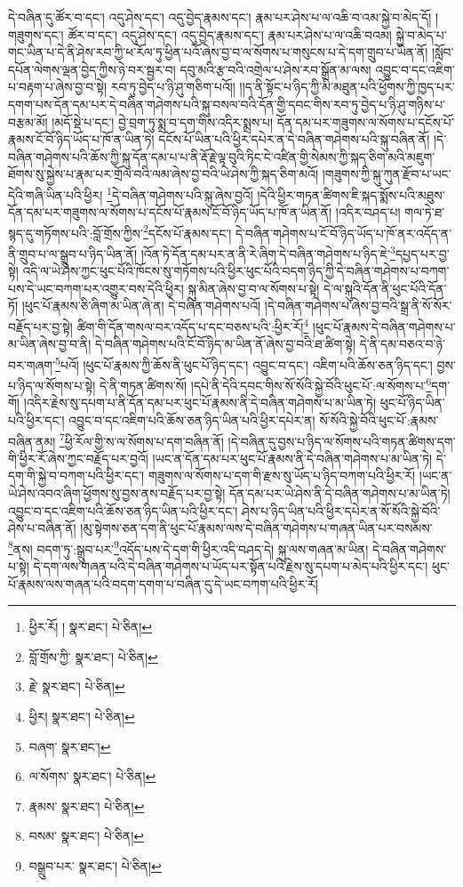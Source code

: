 དེ་བཞིན་དུ་ཚོར་བ་དང་། འདུ་ཤེས་དང་། འདུ་བྱེད་རྣམས་དང་། རྣམ་པར་ཤེས་པ་ལ་འཆི་བ་འམ་སྐྱེ་བ་མེད་དོ། །གཟུགས་དང་། ཚོར་བ་དང་། འདུ་ཤེས་དང་། འདུ་བྱེད་རྣམས་དང་། རྣམ་པར་ཤེས་པ་ལ་འཆི་བའམ། སྐྱེ་བ་མེད་པ་གང་ཡིན་པ་དེ་ནི་ཤེས་རབ་ཀྱི་ཕ་རོལ་ཏུ་ཕྱིན་པའོ་ཞེས་བྱ་བ་ལ་སོགས་པ་གསུངས་པ་དེ་དག་གྲུབ་པ་ཡིན་ནོ། །སློབ་དཔོན་ལེགས་ལྡན་བྱེད་ཀྱིས་ཉེ་བར་སྦྱར་བ། དབུ་མའི་རྩ་བའི་འགྲེལ་པ་ཤེས་རབ་སྒྲོན་མ་ལས། འབྱུང་བ་དང་འཇིག་པ་བརྟག་པ་ཞེས་བྱ་བ་སྟེ། རབ་ཏུ་བྱེད་པ་ཉི་ཤུ་གཅིག་པའོ།། །།ད་ནི་སྟོང་པ་ཉིད་ཀྱི་མི་མཐུན་པའི་ཕྱོགས་ཀྱི་ཁྱད་པར་དགག་པས་དོན་དམ་པར་དེ་བཞིན་གཤེགས་པའི་སྐུ་བསལ་བའི་དོན་གྱི་དབང་གིས་རབ་ཏུ་བྱེད་པ་ཉི་ཤུ་གཉིས་པ་བརྩམ་མོ། །མདོ་སྡེ་པ་དང་། བྱེ་བྲག་ཏུ་སྨྲ་བ་དག་གིས་འདིར་སྨྲས་པ། དོན་དམ་པར་གཟུགས་ལ་སོགས་པ་དངོས་པོ་རྣམས་ངོ་བོ་ཉིད་ཡོད་པ་ཁོ་ན་ཡིན་ཏེ། དངོས་པོ་ཡིན་པའི་ཕྱིར་དཔེར་ན་དེ་བཞིན་གཤེགས་པའི་སྐུ་བཞིན་ནོ། །དེ་བཞིན་གཤེགས་པའི་ཆོས་ཀྱི་སྐུ་དོན་དམ་པ་པ་ནི་རྡོ་རྗེ་ལྟ་བུའི་ཏིང་ངེ་འཛིན་གྱི་སེམས་ཀྱི་སྐད་ཅིག་མའི་མཇུག་ཐོགས་སུ་སྐྱེས་པ་རྣམ་པར་གྲོལ་བའི་ལམ་ཞེས་བྱ་བའི་ཡེ་ཤེས་ཀྱི་སྐད་ཅིག་མའོ། །གཟུགས་ཀྱི་སྐུ་ཀུན་རྫོབ་པ་ཡང་དེའི་གཞི་ཡིན་པའི་ཕྱིར། \footnote{ཕྱིར་རོ། །   སྣར་ཐང་།  པེ་ཅིན། }དེ་བཞིན་གཤེགས་པའི་སྐུ་ཞེས་བྱའོ། །དེའི་ཕྱིར་གཏན་ཚིགས་ཇི་སྐད་སྨོས་པའི་མཐུས་དོན་དམ་པར་གཟུགས་ལ་སོགས་པ་དངོས་པོ་རྣམས་ངོ་བོ་ཉིད་ཡོད་པ་ཁོ་ན་ཡིན་ནོ། །འདིར་བཤད་པ། གལ་ཏེ་ཐ་སྙད་དུ་གཏོགས་པའི་:བློ་གྲོས་ཀྱིས་\footnote{བློ་གྲོས་ཀྱི་  སྣར་ཐང་།  པེ་ཅིན། }དངོས་པོ་རྣམས་དང་། དེ་བཞིན་གཤེགས་པ་ངོ་བོ་ཉིད་ཡོད་པ་ཁོ་ནར་འདོད་ན་ནི་གྲུབ་པ་ལ་སྒྲུབ་པ་ཉིད་ཡིན་ནོ། །འོན་ཏེ་དོན་དམ་པར་ན་ནི་རེ་ཞིག་དེ་བཞིན་གཤེགས་པ་ཉིད་ཇེ་\footnote{རྗེ་  སྣར་ཐང་།  པེ་ཅིན། }དཔྱད་པར་བྱ་སྟེ། འདི་ལ་ཡེ་ཤེས་ཀྱང་ཕུང་པོའི་ཁོངས་སུ་གཏོགས་པའི་ཕྱིར་ཕུང་པོའི་བདག་ཉིད་ཀྱི་དེ་བཞིན་གཤེགས་པ་བཀག་པས་དེ་ཡང་བཀག་པར་འགྱུར་བས་དེའི་ཕྱིར། སྐུ་མིན་ཞེས་བྱ་བ་ལ་སོགས་པ་སྟེ། དེ་ལ་སྐུའི་དོན་ནི་ཕུང་པོའི་དོན་ཏོ། །ཕུང་པོ་རྣམས་ཅི་ཞིག་མ་ཡིན་ཞེ་ན། དེ་བཞིན་གཤེགས་པའོ། །དེ་བཞིན་གཤེགས་པ་ཞེས་བྱ་བའི་སྒྲ་ནི་སོ་སོར་བརྗོད་པར་བྱ་སྟེ། ཚིག་གི་དོན་གསལ་བར་འདོད་པ་དང་བཅས་པའི་:ཕྱིར་རོ།\footnote{ཕྱིར།  སྣར་ཐང་།  པེ་ཅིན། } །ཕུང་པོ་རྣམས་དེ་བཞིན་གཤེགས་པ་མ་ཡིན་ཞེས་བྱ་བ་ནི། དེ་བཞིན་གཤེགས་པའི་ངོ་བོ་ཉིད་མ་ཡིན་ནོ་ཞེས་བྱ་བའི་ཐ་ཚིག་སྟེ། དེ་ནི་དམ་བཅའ་བ་ཉེ་བར་གཞག་\footnote{བཞག་  སྣར་ཐང་། }པའོ། །ཕུང་པོ་རྣམས་ཀྱི་ཆོས་ནི་ཕུང་པོ་ཉིད་དང་། འབྱུང་བ་དང་། འཇིག་པའི་ཆོས་ཅན་ཉིད་དང་། བྱས་པ་ཉིད་ལ་སོགས་པ་སྟེ། དེ་ནི་གཏན་ཚིགས་སོ། །དཔེ་ནི་དེའི་དབང་གིས་སོ་སོའི་སྐྱེ་བོའི་ཕུང་པོ་:ལ་སོགས་པ་\footnote{ལ་སོགས་  སྣར་ཐང་།  པེ་ཅིན། }དག་གོ། །འདིར་རྗེས་སུ་དཔག་པ་ནི་དོན་དམ་པར་ཕུང་པོ་རྣམས་ནི་དེ་བཞིན་གཤེགས་པ་མ་ཡིན་ཏེ། ཕུང་པོ་ཉིད་ཡིན་པའི་ཕྱིར་དང་། འབྱུང་བ་དང་འཇིག་པའི་ཆོས་ཅན་ཉིད་ཡིན་པའི་ཕྱིར་དཔེར་ན། སོ་སོའི་སྐྱེ་བོའི་ཕུང་པོ་:རྣམས་བཞིན་ནམ། \footnote{རྣམས་  སྣར་ཐང་།  པེ་ཅིན། }ཕྱི་རོལ་གྱི་ས་ལ་སོགས་པ་དག་བཞིན་ནོ། །དེ་བཞིན་དུ་བྱས་པ་ཉིད་ལ་སོགས་པའི་གཏན་ཚིགས་དག་གི་ཕྱིར་རོ་ཞེས་ཀྱང་བརྗོད་པར་བྱའོ། །ཡང་ན་དོན་དམ་པར་ཕུང་པོ་རྣམས་ནི་དེ་བཞིན་གཤེགས་པ་མ་ཡིན་ཏེ། དེ་དག་གི་སྐྱེ་བ་བཀག་པའི་ཕྱིར་དང་། གཟུགས་ལ་སོགས་པ་དག་གི་རྫས་སུ་ཡོད་པ་ཉིད་བཀག་པའི་ཕྱིར་རོ། །ཡང་ན་ཡེ་ཤེས་འབའ་ཞིག་ཕྱོགས་སུ་བྱས་ནས་བརྗོད་པར་བྱ་སྟེ། དོན་དམ་པར་ཡེ་ཤེས་ནི་དེ་བཞིན་གཤེགས་པ་མ་ཡིན་ཏེ། འབྱུང་བ་དང་འཇིག་པའི་ཆོས་ཅན་ཉིད་ཡིན་པའི་ཕྱིར་དང་། ཤེས་པ་ཉིད་ཡིན་པའི་ཕྱིར་དཔེར་ན་སོ་སོའི་སྐྱེ་བོའི་ཤེས་པ་བཞིན་ནོ། །མུ་སྟེགས་ཅན་དག་ནི་ཕུང་པོ་རྣམས་ལས་དེ་བཞིན་གཤེགས་པ་གཞན་ཡིན་པར་བསམས་\footnote{བསམ་  སྣར་ཐང་།  པེ་ཅིན། }ནས། བདག་ཏུ་:སྒྲུབ་པར་\footnote{བསྒྲུབ་པར་  སྣར་ཐང་།  པེ་ཅིན། }འདོད་པས་དེ་དག་གི་ཕྱིར་འདི་བཤད་དེ། སྐུ་ལས་གཞན་མ་ཡིན། དེ་བཞིན་གཤེགས་པ་སྟེ། དེ་དག་ལས་གཞན་པའི་དེ་བཞིན་གཤེགས་པ་ཡོད་པར་སྟོན་པའི་རྗེས་སུ་དཔག་པ་མེད་པའི་ཕྱིར་དང་། ཕུང་པོ་རྣམས་ལས་གཞན་པའི་བདག་དགག་པ་བཞིན་དུ་དེ་ཡང་བཀག་པའི་ཕྱིར་རོ། 